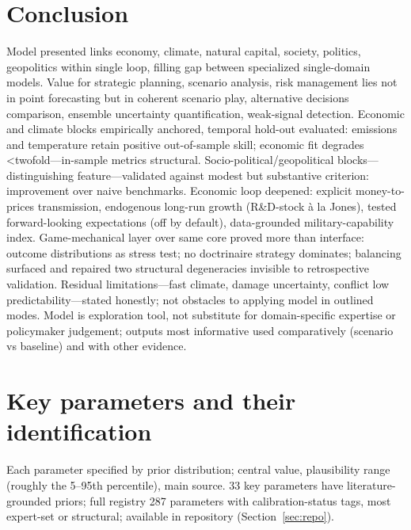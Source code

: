 \documentclass[a4paper,fleqn]{cas-sc}
\begin{document}
\section{Conclusion}

Model presented links economy, climate, natural capital, society, politics, geopolitics within single loop, filling gap between specialized single-domain models. Value for strategic planning, scenario analysis, risk management lies not in point forecasting but in coherent scenario play, alternative decisions comparison, ensemble uncertainty quantification, weak-signal detection. Economic and climate blocks empirically anchored, temporal hold-out evaluated: emissions and temperature retain positive out-of-sample skill; economic fit degrades <twofold---in-sample metrics structural. Socio-political/geopolitical blocks---distinguishing feature---validated against modest but substantive criterion: improvement over naive benchmarks. Economic loop deepened: explicit money-to-prices transmission, endogenous long-run growth (R\&D-stock \`a la Jones), tested forward-looking expectations (off by default), data-grounded military-capability index. Game-mechanical layer over same core proved more than interface: outcome distributions as stress test; no doctrinaire strategy dominates; balancing surfaced and repaired two structural degeneracies invisible to retrospective validation. Residual limitations---fast climate, damage uncertainty, conflict low predictability---stated honestly; not obstacles to applying model in outlined modes. Model is exploration tool, not substitute for domain-specific expertise or policymaker judgement; outputs most informative used comparatively (scenario vs baseline) and with other evidence.

\clearpage
\appendix
\section{Key parameters and their identification}
\label{app:params}

Each parameter specified by prior distribution; central value, plausibility range (roughly the 5--95th percentile), main source. 33 key parameters have literature-grounded priors; full registry 287 parameters with calibration-status tags, most expert-set or structural; available in repository (Section~\ref{sec:repo}).
\end{document}
